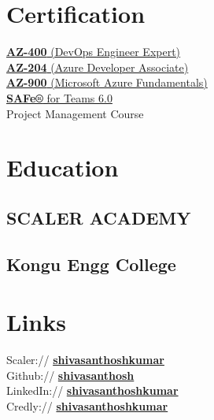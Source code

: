 \documentclass[]{deedy-resume-openfont}
\begin{document}
\begin{minipage}[t]{0.33\textwidth}
\section{Certification} 

\href{https://www.credly.com/badges/b6ecb375-6bad-4ba3-a621-4bfafcd50f4f/public_url}{\textbf{AZ-400} (DevOps Engineer Expert)} \\
\href{https://www.credly.com/badges/7ff91383-901b-493e-b8cc-fcffab306ff6?source=linked_in_profile}{\textbf{AZ-204} (Azure Developer Associate)} \\
\href{https://www.credly.com/badges/2a82bf49-fe81-4faf-a22a-2ba87fefda26?source=linked_in_profile}{\textbf{AZ-900} (Microsoft Azure Fundamentals)} \\
\href{https://www.credly.com/earner/earned/badge/61123942-a068-45e5-98be-1f078245a222}{\textbf{SAFe®} for Teams 6.0}\\
Project Management Course\\

\section{Education} 

\subsection{SCALER ACADEMY }
\sectionsep

\subsection{Kongu Engg College}
\sectionsep



\section{Links} 
Scaler://  \href{https://www.scaler.com/academy/profile/6cb69ccf7d1c}{\bf shivasanthoshkumar} \\ 
Github:// \href{https://github.com/shivasanthosh}{\bf shivasanthosh} \\
LinkedIn://  \href{https://www.linkedin.com/in/shivasanthoshkumar}{\bf shivasanthoshkumar}\\
Credly://  \href{https://www.credly.com/users/shiva-santhosh-kumar-sivakumar/badges}{\bf shivasanthoshkumar}



\end{minipage}
\end{document}
